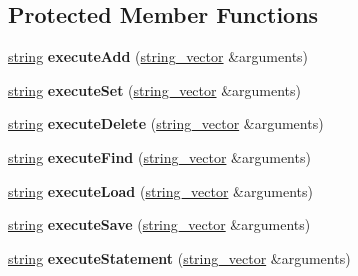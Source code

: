 \subsection*{\-Protected \-Member \-Functions}
\begin{DoxyCompactItemize}
\item 
\hypertarget{classgrafonto_a638219f0ede60ecdd4563759e8610af2}{\hyperlink{classmbdev_1_1string}{string} {\bfseries execute\-Add} (\hyperlink{classmbdev_1_1string__vector}{string\-\_\-vector} \&arguments)}\label{classgrafonto_a638219f0ede60ecdd4563759e8610af2}

\item 
\hypertarget{classgrafonto_ad23ffa340d8adfd8d7d124cfbc2acd5a}{\hyperlink{classmbdev_1_1string}{string} {\bfseries execute\-Set} (\hyperlink{classmbdev_1_1string__vector}{string\-\_\-vector} \&arguments)}\label{classgrafonto_ad23ffa340d8adfd8d7d124cfbc2acd5a}

\item 
\hypertarget{classgrafonto_a70dd25b1813816cf86ce1a648ea73bf6}{\hyperlink{classmbdev_1_1string}{string} {\bfseries execute\-Delete} (\hyperlink{classmbdev_1_1string__vector}{string\-\_\-vector} \&arguments)}\label{classgrafonto_a70dd25b1813816cf86ce1a648ea73bf6}

\item 
\hypertarget{classgrafonto_a830c6f5519f944c6ef2eeff41b614ec1}{\hyperlink{classmbdev_1_1string}{string} {\bfseries execute\-Find} (\hyperlink{classmbdev_1_1string__vector}{string\-\_\-vector} \&arguments)}\label{classgrafonto_a830c6f5519f944c6ef2eeff41b614ec1}

\item 
\hypertarget{classgrafonto_a3f68ed8a56cb970d74213b46f9c79446}{\hyperlink{classmbdev_1_1string}{string} {\bfseries execute\-Load} (\hyperlink{classmbdev_1_1string__vector}{string\-\_\-vector} \&arguments)}\label{classgrafonto_a3f68ed8a56cb970d74213b46f9c79446}

\item 
\hypertarget{classgrafonto_a160a47eeb7221a3b7cebb677f097918c}{\hyperlink{classmbdev_1_1string}{string} {\bfseries execute\-Save} (\hyperlink{classmbdev_1_1string__vector}{string\-\_\-vector} \&arguments)}\label{classgrafonto_a160a47eeb7221a3b7cebb677f097918c}

\item 
\hypertarget{classgrafonto_a7ff5a6e85553906cef2126f3d5ffa8e2}{\hyperlink{classmbdev_1_1string}{string} {\bfseries execute\-Statement} (\hyperlink{classmbdev_1_1string__vector}{string\-\_\-vector} \&arguments)}\label{classgrafonto_a7ff5a6e85553906cef2126f3d5ffa8e2}


\end{DoxyCompactItemize}
